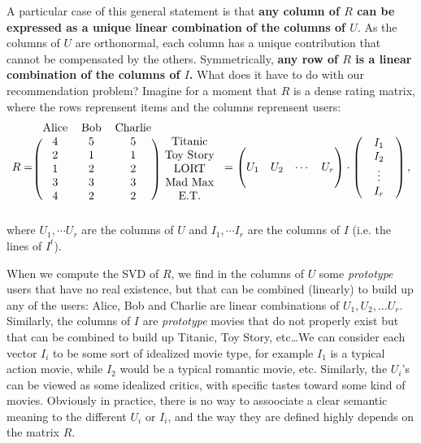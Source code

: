 A particular case of this general statement is that \textbf{any column of $R$
can be expressed as a unique linear combination of the columns of $U$}. As the
columns of $U$ are orthonormal, each column has a unique contribution that
cannot be compensated by the others. Symmetrically, \textbf{any row of $R$ is a
linear combination of the columns of $I$.} What does it have to do with our
recommendation problem? Imagine for a moment that $R$ is a dense rating matrix,
where the rows reprensent items and the columns reprensent users:
$$
R = \begin{blockarray}{cccc}
  \text{Alice} & \text{Bob} & \text{Charlie} \\
\begin{block}{(ccc) c}
  4 & 5 & 5 & \text{Titanic} \\
  2 & 1 & 1 & \text{Toy Story} \\
  1 & 2 & 2 & \text{LORT} \\
  3 & 3 & 3 & \text{Mad Max} \\
  4 & 2 & 2 & \text{E.T.} \\
\end{block}
\end{blockarray}
=
\begin{pmatrix}
  \\
  U_1& U_2 & \cdots & U_r\\
  \\
\end{pmatrix}
\cdot
\begin{pmatrix}
  & I_1 & \\
  & I_2 & \\
  & \vdots & \\
  & I_r & \\
\end{pmatrix}
,
$$
where $U_1, \cdots U_r$ are the columns of $U$ and $I_1, \cdots I_r$ are the
columns of $I$ (i.e. the lines of $I^t$).

When we compute the SVD of $R$, we find in the columns of $U$ some
\textit{prototype} users that have no real existence, but that can be combined
(linearly) to build up any of the users: Alice, Bob and Charlie are linear
combinations of $U_1, U_2, \dots U_r$.  Similarly, the columns of $I$ are
\textit{prototype} movies that do not properly exist but that can be combined
to build up Titanic, Toy Story, etc\dots We can consider each vector $I_i$
to be some sort of idealized movie type, for example $I_1$ is a typical action
movie, while $I_2$ would be a typical romantic movie, etc. Similarly, the
$U_i$'s can be viewed as some idealized critics, with specific tastes toward
some kind of movies. Obviously in practice, there is no way to assoociate a
clear semantic meaning to the different $U_i$ or $I_i$, and the way they are
defined highly depends on the matrix $R$.

